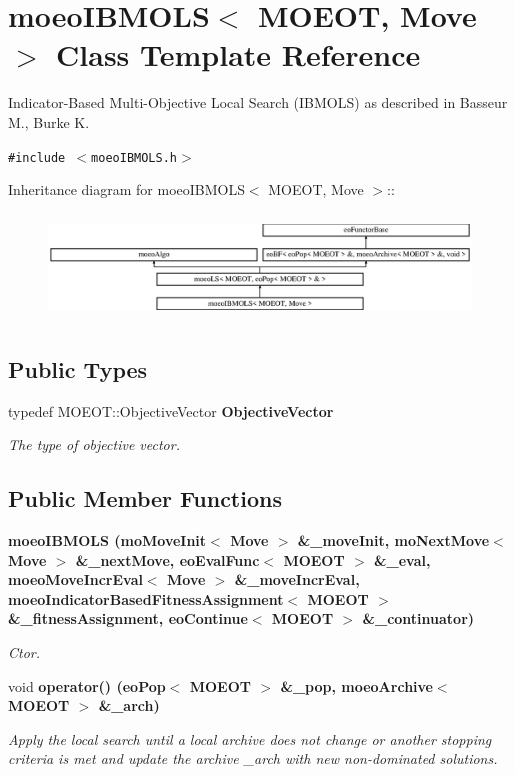\section{moeo\-IBMOLS$<$ MOEOT, Move $>$ Class Template Reference}
\label{classmoeoIBMOLS}
Indicator-Based Multi-Objective Local Search (IBMOLS) as described in Basseur M., Burke K.  


{\tt \#include $<$moeo\-IBMOLS.h$>$}

Inheritance diagram for moeo\-IBMOLS$<$ MOEOT, Move $>$::\begin{figure}[H]
\begin{center}
\leavevmode
\includegraphics[height=2.83544cm]{classmoeoIBMOLS}
\end{center}
\end{figure}
\subsection*{Public Types}
\begin{CompactItemize}
\item 
typedef MOEOT::Objective\-Vector \bf{Objective\-Vector}\label{classmoeoIBMOLS_d3433001dcc9a6e2a967aa5d64163935}

\begin{CompactList}\small\item\em The type of objective vector. \item\end{CompactList}\end{CompactItemize}
\subsection*{Public Member Functions}
\begin{CompactItemize}
\item 
\bf{moeo\-IBMOLS} (mo\-Move\-Init$<$ Move $>$ \&\_\-move\-Init, mo\-Next\-Move$<$ Move $>$ \&\_\-next\-Move, \bf{eo\-Eval\-Func}$<$ MOEOT $>$ \&\_\-eval, \bf{moeo\-Move\-Incr\-Eval}$<$ Move $>$ \&\_\-move\-Incr\-Eval, \bf{moeo\-Indicator\-Based\-Fitness\-Assignment}$<$ MOEOT $>$ \&\_\-fitness\-Assignment, \bf{eo\-Continue}$<$ MOEOT $>$ \&\_\-continuator)
\begin{CompactList}\small\item\em Ctor. \item\end{CompactList}\item 
void \bf{operator()} (\bf{eo\-Pop}$<$ MOEOT $>$ \&\_\-pop, \bf{moeo\-Archive}$<$ MOEOT $>$ \&\_\-arch)
\begin{CompactList}\small\item\em Apply the local search until a local archive does not change or another stopping criteria is met and update the archive \_\-arch with new non-dominated solutions. \item\end{CompactList}\end{CompactItemize}

